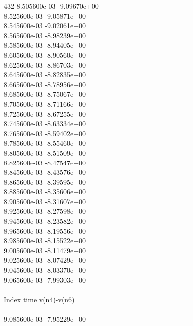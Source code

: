 432	8.505600e-03	-9.09670e+00	\\ 	8.525600e-03	-9.05871e+00	\\ 	8.545600e-03	-9.02061e+00	\\ 	8.565600e-03	-8.98239e+00	\\ 	8.585600e-03	-8.94405e+00	\\ 	8.605600e-03	-8.90560e+00	\\ 	8.625600e-03	-8.86703e+00	\\ 	8.645600e-03	-8.82835e+00	\\ 	8.665600e-03	-8.78956e+00	\\ 	8.685600e-03	-8.75067e+00	\\ 	8.705600e-03	-8.71166e+00	\\ 	8.725600e-03	-8.67255e+00	\\ 	8.745600e-03	-8.63334e+00	\\ 	8.765600e-03	-8.59402e+00	\\ 	8.785600e-03	-8.55460e+00	\\ 	8.805600e-03	-8.51509e+00	\\ 	8.825600e-03	-8.47547e+00	\\ 	8.845600e-03	-8.43576e+00	\\ 	8.865600e-03	-8.39595e+00	\\ 	8.885600e-03	-8.35606e+00	\\ 	8.905600e-03	-8.31607e+00	\\ 	8.925600e-03	-8.27598e+00	\\ 	8.945600e-03	-8.23582e+00	\\ 	8.965600e-03	-8.19556e+00	\\ 	8.985600e-03	-8.15522e+00	\\ 	9.005600e-03	-8.11479e+00	\\ 	9.025600e-03	-8.07429e+00	\\ 	9.045600e-03	-8.03370e+00	\\ 	9.065600e-03	-7.99303e+00	\\ \hline
\\ \hline
Index   time            v(n4)-v(n6)     \\ \hline
--------------------------------------------------------------------------------\\ 	9.085600e-03	-7.95229e+00	\\ \hline
